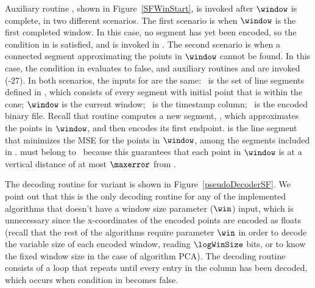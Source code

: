 Auxiliary routine \SFWinStart, shown in Figure~\ref{SFWinStart}, is invoked after $\window$ is complete, in two different scenarios. The first scenario is when $\window$ is the first completed window. In this case, no segment has yet been encoded, so the condition in  is satisfied, and \SFWinStart is invoked in . The second scenario is when a connected segment approximating the points in $\window$ cannot be found. In this case, the condition in  evaluates to false, and auxiliary routines \SFWinEnd and \SFWinStart are invoked (-27). In both scenarios, the inputs for \SFWinStart are the same: \segmentSet\ is the set of line segments defined in , which consists of every segment with initial point \intersection that is within the cone; $\window$ is the current window; \tscol\ is the timestamp column; \out\ is the encoded binary file. Recall that routine \SFWinStart computes a new segment, \segmentS, which approximates the points in $\window$, and then encodes its first endpoint. \segmentS is the line segment that minimizes the MSE for the points in $\window$, among the segments included in \segmentSet. \segmentS must belong to \segmentSet\ because this guarantees that each point in $\window$ is at a vertical distance of at most $\maxerror$ from \segmentS.


\vspace{+5pt}
The decoding routine for variant \maskalgo is shown in Figure~\ref{pseudoDecoderSF}. We point out that this is the only decoding routine for any of the implemented algorithms that doesn't have a window size parameter ($\win$) input, which is unnecessary since the x-coordinates of the encoded points are encoded as floats (recall that the rest of the algorithms require parameter $\win$ in order to decode the variable size of each encoded window, reading $\logWinSize$ bits, or to know the fixed window size in the case of algorithm PCA). The decoding routine consists of a loop that repeats until every entry in the column has been decoded, which occurs when condition in  becomes false. 





\clearpage


